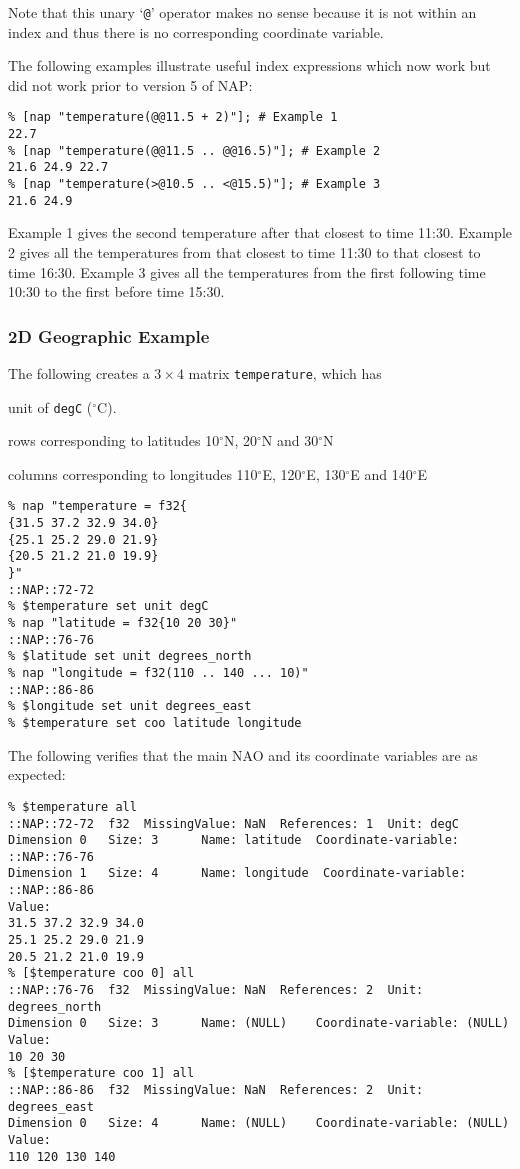 Note that this unary `\texttt{@}'
operator makes no sense because it is not within
  an index and thus there is no corresponding coordinate variable.
  

The following examples illustrate useful index expressions which
  now work but did not work prior to version 5 of NAP:
  \begin{verbatim}
% [nap "temperature(@@11.5 + 2)"]; # Example 1
22.7
% [nap "temperature(@@11.5 .. @@16.5)"]; # Example 2
21.6 24.9 22.7
% [nap "temperature(>@10.5 .. <@15.5)"]; # Example 3
21.6 24.9
\end{verbatim}

Example 1 gives the second temperature after that closest to time
11:30. Example 2 gives all the temperatures from that closest to time
11:30 to that closest to time 16:30. Example 3 gives all the
temperatures from the first following time 10:30 to the first before
time 15:30.

\subsubsection{2D Geographic Example}
    \label{indexing-indirect-2d}

The following creates a $3 \times 4$ matrix 
  \texttt{temperature}, which has
\begin{bullets}
    \item unit of 
    \texttt{degC} ($^{\circ}$C).
    \item rows corresponding to latitudes 10$^{\circ}$N, 20$^{\circ}$N and 30$^{\circ}$N
    \item columns corresponding to longitudes 110$^{\circ}$E, 120$^{\circ}$E, 130$^{\circ}$E and
    140$^{\circ}$E
\end{bullets}
\begin{verbatim}
% nap "temperature = f32{
{31.5 37.2 32.9 34.0}
{25.1 25.2 29.0 21.9}
{20.5 21.2 21.0 19.9}
}"
::NAP::72-72
% $temperature set unit degC
% nap "latitude = f32{10 20 30}"
::NAP::76-76
% $latitude set unit degrees_north
% nap "longitude = f32(110 .. 140 ... 10)"
::NAP::86-86
% $longitude set unit degrees_east
% $temperature set coo latitude longitude
\end{verbatim}

The following verifies that the main NAO and its coordinate
variables are as expected:
  \begin{verbatim}
% $temperature all
::NAP::72-72  f32  MissingValue: NaN  References: 1  Unit: degC
Dimension 0   Size: 3      Name: latitude  Coordinate-variable: ::NAP::76-76
Dimension 1   Size: 4      Name: longitude  Coordinate-variable: ::NAP::86-86
Value:
31.5 37.2 32.9 34.0
25.1 25.2 29.0 21.9
20.5 21.2 21.0 19.9
% [$temperature coo 0] all
::NAP::76-76  f32  MissingValue: NaN  References: 2  Unit: degrees_north
Dimension 0   Size: 3      Name: (NULL)    Coordinate-variable: (NULL)
Value:
10 20 30
% [$temperature coo 1] all
::NAP::86-86  f32  MissingValue: NaN  References: 2  Unit: degrees_east
Dimension 0   Size: 4      Name: (NULL)    Coordinate-variable: (NULL)
Value:
110 120 130 140
\end{verbatim}

